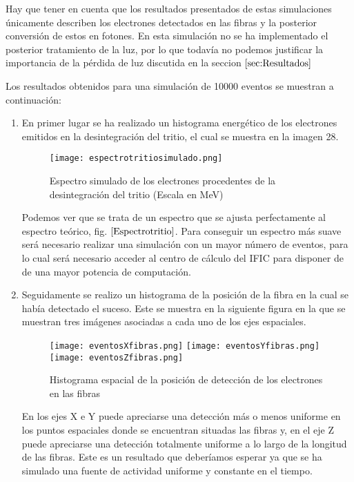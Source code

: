 Hay que tener en cuenta que los resultados presentados de estas simulaciones únicamente describen los electrones detectados en las fibras y la posterior conversión de estos en fotones. En esta simulación no se ha implementado el posterior tratamiento de la luz, por lo que todavía no podemos justificar la importancia de la pérdida de luz discutida en la seccion $\ref{sec:Resultados}$

Los resultados obtenidos para una simulación de 10000 eventos se muestran a continuación:
\begin{enumerate}
\item{} En primer lugar se ha realizado un histograma energético de los electrones emitidos en la desintegración del tritio, el cual se muestra en la imagen 28.

\begin{figure}[hbtp]
\centering
\texttt{[image: espectrotritiosimulado.png]}
\caption{Espectro simulado de los electrones procedentes de la desintegración del tritio (Escala en MeV)\label{espectrotritiosimulado}}
\end{figure}

Podemos ver que se trata de un espectro que se ajusta perfectamente al espectro teórico, fig. $\ref{Espectrotritio}$. Para conseguir un espectro más suave será necesario realizar una simulación con un mayor número de eventos, para lo cual será necesario acceder al centro de cálculo del IFIC para disponer de de una mayor potencia de computación.

\item{} Seguidamente se realizo un histograma de la posición de la fibra en la cual se había detectado el suceso. Este se muestra en la siguiente figura en la que se muestran tres imágenes asociadas a cada uno de los ejes espaciales.

\begin{figure}[htb]
\centering
{
\texttt{[image: eventosXfibras.png]} 
}
{
\texttt{[image: eventosYfibras.png]} 
}
{
\texttt{[image: eventosZfibras.png]} 
}
\caption{Histograma espacial de la posición de detección de los electrones en las fibras\label{espectroespacial}}
\end{figure}

En los ejes X e Y puede apreciarse una detección más o menos uniforme en los puntos espaciales donde se encuentran situadas las fibras y, en el eje Z puede apreciarse una detección totalmente uniforme a lo largo de la longitud de las fibras. Este es un resultado que deberíamos esperar ya que se ha simulado una fuente de actividad uniforme y constante en el tiempo.


\end{enumerate}

